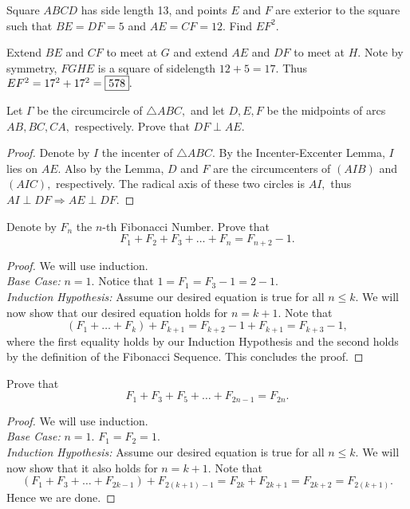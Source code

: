 \documentclass[letterpaper,oneside]{scrartcl}
\begin{document}
\begin{problem*}
  Square $ABCD$ has side length 13, and points $E$ and $F$ are exterior to the square such that $BE = DF = 5$ and $AE = CF = 12$. Find $EF^2$.
\end{problem*}
\begin{soln}
  Extend $BE$ and $CF$ to meet at $G$ and extend $AE$ and $DF$ to meet at $H.$ Note by symmetry, $FGHE$ is a square of sidelength $12+5=17.$ Thus $EF^2 = 17^2+17^2 = \fbox{578}.$
\end{soln}
\begin{problem*}
  Let $\Gamma$ be the circumcircle of $\triangle ABC,$ and let $D,E,F$ be the midpoints of arcs $AB,BC,CA,$ respectively. Prove that $DF\perp AE.$
\end{problem*}
\begin{proof}
  Denote by $I$ the incenter of $\triangle ABC.$ By the Incenter-Excenter Lemma, $I$ lies on $AE.$ Also by the Lemma, $D$ and $F$ are the circumcenters of $(AIB)$ and $(AIC),$ respectively. The radical axis of these two circles is $AI,$ thus $AI \perp DF \Longrightarrow AE \perp DF.$
\end{proof}
\begin{problem*}
  Denote by $F_n$ the $n$-th Fibonacci Number. Prove that
  \[F_1+F_2+F_3+\dots+F_n=F_{n+2}-1.\]
\end{problem*}
\begin{proof}
  We will use induction.\\
  \indent\textit{Base Case:} \(n=1.\) Notice that \(1=F_1=F_3-1=2-1.\)\\
  \indent\textit{Induction Hypothesis:} Assume our desired equation is true for all \(n \leq k\). We will now show that our desired equation holds for \(n = k+1.\) Note that
  \[(F_1+\dots+F_k)+F_{k+1}=F_{k+2}-1+F_{k+1}=F_{k+3}-1,\]
  where the first equality holds by our Induction Hypothesis and the second holds by the definition of the Fibonacci Sequence. This concludes the proof.
\end{proof}
\newpage
\begin{problem*}
  Prove that
  \[F_1+F_3+F_5+\dots+F_{2n-1}=F_{2n}.\]
\end{problem*}
\begin{proof}
  We will use induction.\\
  \indent\textit{Base Case:} \(n=1.\) \(F_1=F_2=1.\)\\
  \indent\textit{Induction Hypothesis:} Assume our desired equation is true for all \(n\leq k.\) We will now show that it also holds for \(n=k+1.\) Note that
  \[(F_1+F_3+\dots+F_{2k-1})+F_{2(k+1)-1}=F_{2k}+F_{2k+1}=F_{2k+2}=F_{2(k+1)}.\] Hence we are done.
\end{proof}
\end{document}
